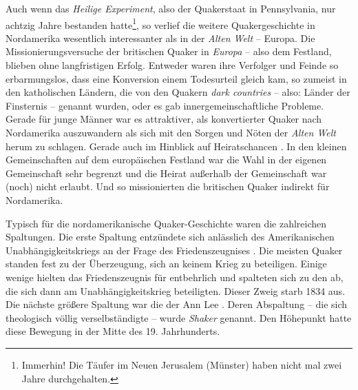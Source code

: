 \medskip

Auch wenn das \textit{Heilige Experiment}, also der Quakerstaat in Pennsylvania,
nur achtzig Jahre
bestanden hatte\footnote{Immerhin! Die Täufer im Neuen Jerusalem (Münster)
  haben
nicht mal zwei Jahre durchgehalten.}, so verlief die weitere
Quakergeschichte in Nordamerika wesentlich interessanter als in der
\textit{Alten
Welt} -- Europa. Die Missionierungsversuche  der britischen
Quaker in
\textit{Europa}  -- also dem Festland, blieben ohne
langfristigen Erfolg.
Entweder waren ihre Verfolger  und Feinde so erbarmungslos,
dass eine
Konversion einem Todesurteil gleich kam, so zumeist in den katholischen
Ländern, die von den Quakern \textit{dark countries} -- also: Länder der
Finsternis -- genannt wurden, oder es gab innergemeinschaftliche Probleme.
Gerade
für junge Männer war es attraktiver, als konvertierter Quaker nach Nordamerika
auszuwandern als sich mit den Sorgen und Nöten der \textit{Alten Welt} herum
zu
schlagen. Gerade auch im Hinblick auf Heiratschancen . In den
kleinen
Gemeinschaften auf dem europäischen Festland war die Wahl in der eigenen
Gemeinschaft sehr begrenzt und die Heirat außerhalb der Gemeinschaft war (noch)
nicht erlaubt. Und so missionierten die britischen Quaker indirekt für
Nordamerika.

\medskip

Typisch für die nordamerikanische Quaker-Geschichte waren die zahlreichen
Spaltungen. Die erste Spaltung  entzündete sich anlässlich des
Amerikanischen
Unabhängigkeitskriegs an der Frage des Friedenszeugnises
. Die meisten Quaker
standen fest zu der Überzeugung, sich an keinem Krieg  zu
beteiligen. Einige
wenige hielten das Friedenszeugnis für entbehrlich und spalteten sich zu den
  ab,
die sich dann am Unabhängigkeitskrieg 
beteiligten. Dieser Zweig starb 1834 aus. Die nächste größere Spaltung war die
der Ann Lee . Deren Abspaltung -- die sich theologisch
völlig verselbständigte --
wurde \textit{Shaker}  genannt. Den Höhepunkt hatte
diese Bewegung in der Mitte
des 19. Jahrhunderts.

\medskip

